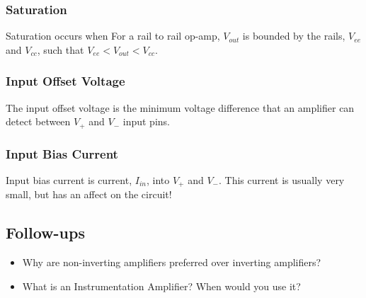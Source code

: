 \documentclass[main.tex]{subfiles}
\begin{document}
\subsubsection{Saturation}
Saturation occurs when 
For a rail to rail op-amp, $V_{out}$ is bounded by the rails, $V_{ee}$ and $V_{cc}$, such that $V_{ee} < V_{out} < V_{cc}$. 

\subsubsection{Input Offset Voltage}
The input offset voltage is the minimum voltage difference that an amplifier can detect between $V_{+}$ and $V_{-}$ input pins. 

\subsubsection{Input Bias Current}
Input bias current is current, $I_{in}$, into $V_{+}$ and $V_{-}$. This current is usually very small, but has an affect on the circuit! 

\subsection{Follow-ups}
\begin{itemize}
    \item Why are non-inverting amplifiers preferred over inverting amplifiers? %
    \item What is an Instrumentation Amplifier? When would you use it? %
\end{itemize}
\end{document}
